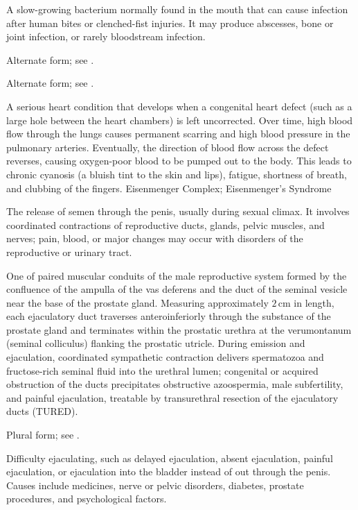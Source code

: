  A slow-growing bacterium normally found in the mouth that can cause infection after human bites or clenched-fist injuries. It may produce abscesses, bone or joint infection, or rarely bloodstream infection.

 Alternate form; see .

 Alternate form; see .

 A serious heart condition that develops when a congenital heart defect (such as a large hole between the heart chambers) is left uncorrected. Over time, high blood flow through the lungs causes permanent scarring and high blood pressure in the pulmonary arteries. Eventually, the direction of blood flow across the defect reverses, causing oxygen-poor blood to be pumped out to the body. This leads to chronic cyanosis (a bluish tint to the skin and lips), fatigue, shortness of breath, and clubbing of the fingers.
\synonyms
Eisenmenger Complex; Eisenmenger's Syndrome

 The release of semen through the penis, usually during sexual climax. It involves coordinated contractions of reproductive ducts, glands, pelvic muscles, and nerves; pain, blood, or major changes may occur with disorders of the reproductive or urinary tract.

 One of paired muscular conduits of the male reproductive system formed by the confluence of the ampulla of the vas deferens and the duct of the seminal vesicle near the base of the prostate gland. Measuring approximately $2\,\text{cm}$ in length, each ejaculatory duct traverses anteroinferiorly through the substance of the prostate gland and terminates within the prostatic urethra at the verumontanum (seminal colliculus) flanking the prostatic utricle. During emission and ejaculation, coordinated sympathetic contraction delivers spermatozoa and fructose-rich seminal fluid into the urethral lumen; congenital or acquired obstruction of the ducts precipitates obstructive azoospermia, male subfertility, and painful ejaculation, treatable by transurethral resection of the ejaculatory ducts (TURED).

 Plural form; see .

 Difficulty ejaculating, such as delayed ejaculation, absent ejaculation, painful ejaculation, or ejaculation into the bladder instead of out through the penis. Causes include medicines, nerve or pelvic disorders, diabetes, prostate procedures, and psychological factors.

